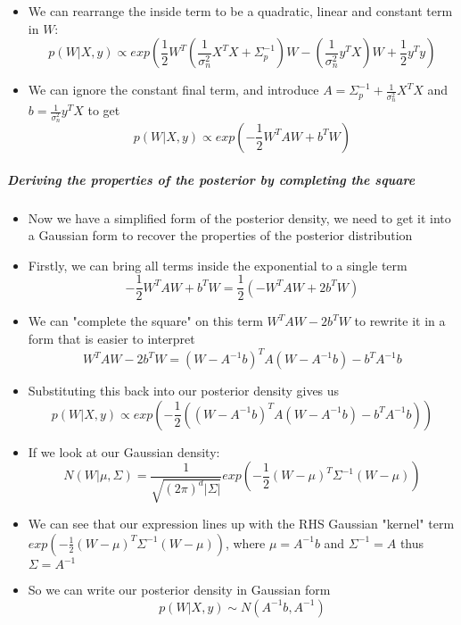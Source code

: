 \documentclass[12pt]{article}
\begin{document}
\begin{itemize}
\begin{equation}
 \end{equation}
     \item We can rearrange the inside term to be a quadratic, linear and constant term in $W$:
 \begin{equation}
     p(W|X,y) \propto exp\left(\frac{1}{2}W^T\left(\frac{1}{\sigma^2_n}X^TX + \Sigma_p^{-1}\right)W - \left(\frac{1}{\sigma^2_n}y^TX\right)W + \frac{1}{2}y^Ty\right)
 \end{equation}
     \item We can ignore the constant final term, and introduce $A = \Sigma_p^{-1} + \frac{1}{\sigma^2_n}X^TX$ and $b = \frac{1}{\sigma^2_n}y^TX$ to get
 \begin{equation}
     p(W|X,y) \propto exp\left(-\frac{1}{2}W^TAW + b^TW\right)
 \end{equation}
\end{itemize}

\subparagraph{Deriving the properties of the posterior by completing the square}
\begin{itemize}
     \item Now we have a simplified form of the posterior density, we need to get it into a Gaussian form to recover the properties of the posterior distribution
    \item Firstly, we can bring all terms inside the exponential to a single term
\begin{equation}
    -\frac{1}{2}W^TAW + b^TW = \frac{1}{2}\left(-W^TAW + 2b^TW\right)
\end{equation}
    \item We can "complete the square" on this term $W^TAW - 2b^TW$ to rewrite it in a form that is easier to interpret
\begin{equation}
    W^TAW - 2b^TW = (W - A^{-1}b)^TA(W - A^{-1}b) - b^TA^{-1}b
\end{equation}
    \item Substituting this back into our posterior density gives us
\begin{equation}
    p(W|X,y) \propto exp\left(-\frac{1}{2}\left((W - A^{-1}b)^TA(W - A^{-1}b) - b^TA^{-1}b\right)\right)
\end{equation}
    \item If we look at our Gaussian density: 
\begin{equation}
    N(W | \mu, \Sigma) = \frac{1}{\sqrt{(2\pi)^d |\Sigma|}} exp\left(-\frac{1}{2}(W - \mu)^T\Sigma^{-1}(W - \mu)\right)
\end{equation}
    \item We can see that our expression lines up with the RHS Gaussian "kernel" term $exp\left(-\frac{1}{2}(W - \mu)^T\Sigma^{-1}(W - \mu)\right)$, where $\mu = A^{-1}b$ and $\Sigma^{-1} = A$ thus $\Sigma = A^{-1}$
    \item So we can write our posterior density in Gaussian form
\begin{equation}
    p(W|X,y) \sim N(A^{-1}b, A^{-1})
\end{equation}
\end{itemize}
\end{document}
